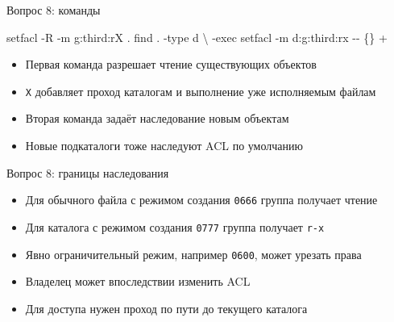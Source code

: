 \documentclass[
  ignorenonframetext,
  aspectratio=169,
  russian,
]{beamer}
\newenvironment{Shaded}{\begin{snugshade}}{\end{snugshade}}
\newcommand{\AttributeTok}[1]{\textcolor[rgb]{0.40,0.45,0.13}{#1}}
\newcommand{\DataTypeTok}[1]{\textcolor[rgb]{0.68,0.00,0.00}{#1}}
\newcommand{\ExtensionTok}[1]{\textcolor[rgb]{0.00,0.23,0.31}{#1}}
\newcommand{\FunctionTok}[1]{\textcolor[rgb]{0.28,0.35,0.67}{#1}}
\newcommand{\NormalTok}[1]{\textcolor[rgb]{0.00,0.23,0.31}{#1}}
\providecommand{\tightlist}{%
  \setlength{\itemsep}{0pt}\setlength{\parskip}{0pt}}
\begin{document}
\begin{frame}[fragile]{Вопрос 8: команды}
\protect{}\label{ux432ux43eux43fux440ux43eux441-8-ux43aux43eux43cux430ux43dux434ux44b}
\begin{Shaded}
\begin{Highlighting}[]
\ExtensionTok{setfacl} \AttributeTok{{-}R} \AttributeTok{{-}m}\NormalTok{ g:third:rX .}
\FunctionTok{find}\NormalTok{ . }\AttributeTok{{-}type}\NormalTok{ d }\DataTypeTok{\textbackslash{}}
  \AttributeTok{{-}exec}\NormalTok{ setfacl }\AttributeTok{{-}m}\NormalTok{ d:g:third:rx }\AttributeTok{{-}{-}}\NormalTok{ \{\} +}
\end{Highlighting}
\end{Shaded}

\begin{itemize}
\tightlist
\item
  Первая команда разрешает чтение существующих объектов
\item
  \texttt{X} добавляет проход каталогам и выполнение уже исполняемым
  файлам
\item
  Вторая команда задаёт наследование новым объектам
\item
  Новые подкаталоги тоже наследуют ACL по умолчанию
\end{itemize}
\end{frame}

\begin{frame}[fragile]{Вопрос 8: границы наследования}
\protect{}\label{ux432ux43eux43fux440ux43eux441-8-ux433ux440ux430ux43dux438ux446ux44b-ux43dux430ux441ux43bux435ux434ux43eux432ux430ux43dux438ux44f}
\begin{itemize}
\tightlist
\item
  Для обычного файла с режимом создания \texttt{0666} группа получает
  чтение
\item
  Для каталога с режимом создания \texttt{0777} группа получает
  \texttt{r-x}
\item
  Явно ограничительный режим, например \texttt{0600}, может урезать
  права
\item
  Владелец может впоследствии изменить ACL
\item
  Для доступа нужен проход по пути до текущего каталога
\end{itemize}
\end{frame}
\end{document}

